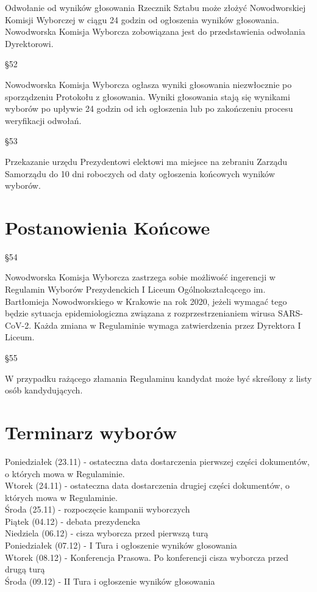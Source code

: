 \documentclass[12pt]{article}
\begin{document}
    Odwołanie od wyników głosowania Rzecznik Sztabu   może złożyć Nowodworskiej Komisji Wyborczej w ciągu 24 godzin od ogłoszenia wyników głosowania. Nowodworska Komisja Wyborcza zobowiązana jest do przedstawienia odwołania Dyrektorowi. 
    \begin{center}
        \S 52\\
    \end{center}
    Nowodworska Komisja Wyborcza ogłasza wyniki głosowania niezwłocznie po sporządzeniu Protokołu z głosowania. Wyniki głosowania stają się wynikami wyborów po upływie 24 godzin od ich ogłoszenia lub po zakończeniu procesu weryfikacji odwołań. 
    \begin{center}
        \S 53\\
    \end{center}
    Przekazanie urzędu Prezydentowi elektowi ma miejsce na zebraniu Zarządu Samorządu do 10 dni roboczych od daty ogłoszenia końcowych wyników wyborów.
\newpage

\section{Postanowienia Końcowe}
    \begin{center}
        \S 54\\
    \end{center}
    Nowodworska Komisja Wyborcza zastrzega sobie możliwość ingerencji w Regulamin Wyborów Prezydenckich I Liceum Ogólnokształcącego im. Bartłomieja Nowodworskiego w Krakowie na rok 2020, jeżeli wymagać tego będzie sytuacja epidemiologiczna związana z rozprzestrzenianiem wirusa SARS-CoV-2. Każda zmiana w Regulaminie wymaga zatwierdzenia przez Dyrektora I Liceum.\\
    \begin{center}
        \S 55\\
    \end{center}
    W przypadku rażącego złamania Regulaminu kandydat może być skreślony z listy osób kandydujących. 

\newpage
\appendix
\section*{}
\section{Terminarz wyborów}
Poniedziałek (23.11) - ostateczna data dostarczenia pierwszej części dokumentów, o których mowa w Regulaminie.\\
Wtorek (24.11) -  ostateczna data dostarczenia drugiej części dokumentów, o których mowa w Regulaminie.\\
Środa (25.11) - rozpoczęcie kampanii wyborczych\\
Piątek (04.12) - debata prezydencka\\
Niedziela (06.12) - cisza wyborcza przed pierwszą turą\\
Poniedziałek (07.12) - I Tura i ogłoszenie wyników głosowania\\
Wtorek (08.12) - Konferencja Prasowa. Po konferencji cisza wyborcza przed drugą turą\\
Środa (09.12) - II Tura i ogłoszenie wyników głosowania\\
\end{document}
